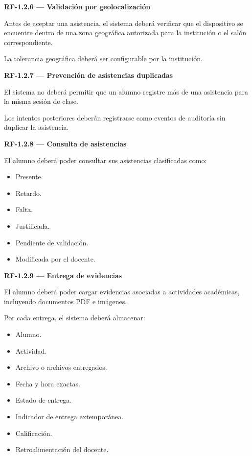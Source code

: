 \documentclass[12pt,a4paper]{article}
\newcommand{\RF}[1]{\textbf{\color{primary}RF-#1}}
\newenvironment{requisito}[1]
{
\begin{center}
\begin{minipage}{0.96\textwidth}
\colorbox{requirement}{
\begin{minipage}{0.94\textwidth}
\textbf{#1}
\end{minipage}
}
\vspace{2mm}
}
{
\end{minipage}
\end{center}
}
\begin{document}
\begin{requisito}{\RF{1.2.6} --- Validación por geolocalización}
Antes de aceptar una asistencia, el sistema deberá verificar que el dispositivo
se encuentre dentro de una zona geográfica autorizada para la institución o el
salón correspondiente.

La tolerancia geográfica deberá ser configurable por la institución.
\end{requisito}

\begin{requisito}{\RF{1.2.7} --- Prevención de asistencias duplicadas}
El sistema no deberá permitir que un alumno registre más de una asistencia para
la misma sesión de clase.

Los intentos posteriores deberán registrarse como eventos de auditoría sin
duplicar la asistencia.
\end{requisito}

\begin{requisito}{\RF{1.2.8} --- Consulta de asistencias}
El alumno deberá poder consultar sus asistencias clasificadas como:

\begin{itemize}[leftmargin=*]
\item Presente.
\item Retardo.
\item Falta.
\item Justificada.
\item Pendiente de validación.
\item Modificada por el docente.
\end{itemize}
\end{requisito}

\begin{requisito}{\RF{1.2.9} --- Entrega de evidencias}
El alumno deberá poder cargar evidencias asociadas a actividades académicas,
incluyendo documentos PDF e imágenes.

Por cada entrega, el sistema deberá almacenar:

\begin{itemize}[leftmargin=*]
\item Alumno.
\item Actividad.
\item Archivo o archivos entregados.
\item Fecha y hora exactas.
\item Estado de entrega.
\item Indicador de entrega extemporánea.
\item Calificación.
\item Retroalimentación del docente.
\end{itemize}
\end{requisito}
\end{document}
